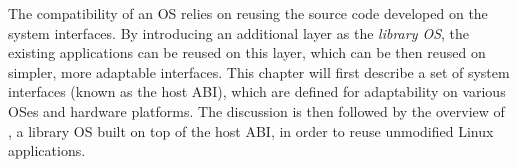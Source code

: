 The compatibility of an OS relies on reusing the source code developed on the system interfaces.
By introducing an additional layer as the {\em library OS},
the existing applications can be reused on this layer, which can be then reused on simpler, more adaptable interfaces.
This chapter will first describe a set of system interfaces (known as the host ABI), which are defined for adaptability on various OSes and hardware platforms. The discussion is then followed by the overview of \graphene{}, a library OS built on top of the host ABI, in order to reuse unmodified Linux applications.